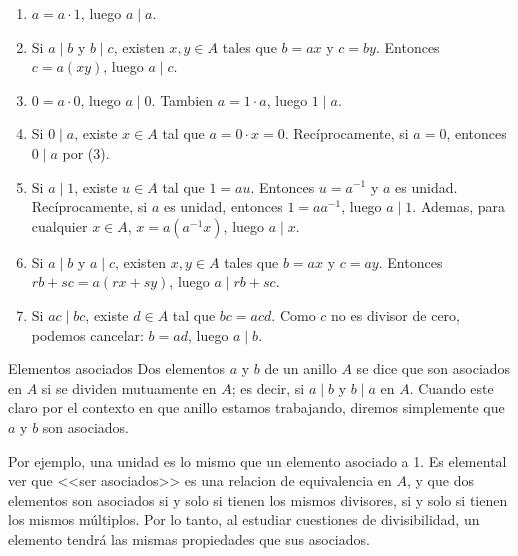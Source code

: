 \begin{proofbox}
\begin{enumerate}
\item \(a = a \cdot 1\), luego \(a \mid a\).

\item Si \(a \mid b\) y \(b \mid c\), existen \(x, y \in A\) tales que \(b = ax\) y \(c = by\). Entonces \(c = a(xy)\), luego \(a \mid c\).

\item \(0 = a \cdot 0\), luego \(a \mid 0\). Tambien \(a = 1 \cdot a\), luego \(1 \mid a\).

\item Si \(0 \mid a\), existe \(x \in A\) tal que \(a = 0 \cdot x = 0\). Recíprocamente, si \(a = 0\), entonces \(0 \mid a\) por (3).

\item Si \(a \mid 1\), existe \(u \in A\) tal que \(1 = au\). Entonces \(u = a^{-1}\) y \(a\) es unidad. Recíprocamente, si \(a\) es unidad, entonces \(1 = a a^{-1}\), luego \(a \mid 1\). Ademas, para cualquier \(x \in A\), \(x = a(a^{-1}x)\), luego \(a \mid x\).

\item Si \(a \mid b\) y \(a \mid c\), existen \(x, y \in A\) tales que \(b = ax\) y \(c = ay\). Entonces \(rb + sc = a(rx + sy)\), luego \(a \mid rb + sc\).

\item Si \(ac \mid bc\), existe \(d \in A\) tal que \(bc = acd\). Como \(c\) no es divisor de cero, podemos cancelar: \(b = ad\), luego \(a \mid b\).
\end{enumerate}
\end{proofbox}

\begin{definition}{Elementos asociados}{}
Dos elementos \(a\) y \(b\) de un anillo \(A\) se dice que son asociados en \(A\) si se dividen mutuamente en \(A\); es decir, si \(a \mid b\) y \(b \mid a\) en \(A\). Cuando este claro por el contexto en que anillo estamos trabajando, diremos simplemente que \(a\) y \(b\) son asociados.
\end{definition}

Por ejemplo, una unidad es lo mismo que un elemento asociado a 1.
Es elemental ver que <<ser asociados>> es una relacion de equivalencia en \(A\), y que dos elementos son asociados si y solo si tienen los mismos divisores, si y solo si tienen los mismos múltiplos. Por lo tanto, al estudiar cuestiones de divisibilidad, un elemento tendrá las mismas propiedades que sus asociados.

